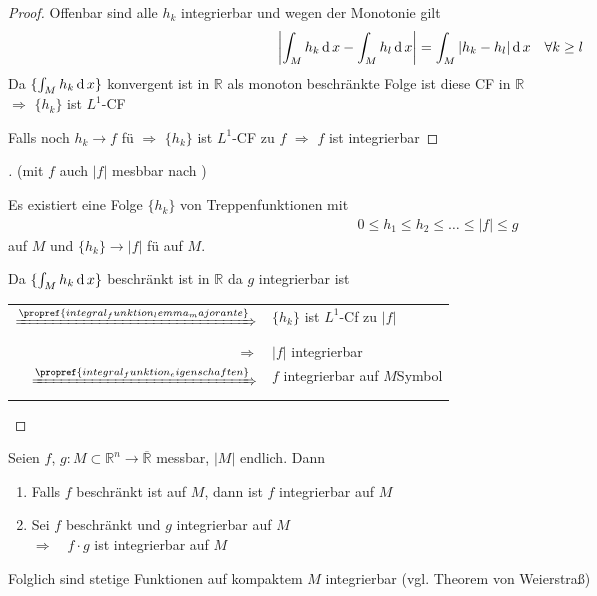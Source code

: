 \begin{proof}
	Offenbar sind alle $h_k$ integrierbar und wegen der Monotonie gilt \begin{align*}
		\left\vert \int_M h_k\operatorname{d} x - \int_M h_l\operatorname{d} x \right\vert &=\int_M \vert h_k - h_l\vert \operatorname{d} x\quad\forall k\ge l
	\end{align*}
	Da $\{ \int_M h_k \operatorname{d} x \}$ konvergent ist in $\mathbb{R}$ als monoton beschränkte Folge ist diese CF in $\mathbb{R}$ \\
	$\Rightarrow$ $\{ h_k\}$ ist $L^1$-CF
	
	Falls noch $h_k\to f$ \gls{fü} $\Rightarrow$ $\{h_k\}$ ist $L^1$-CF zu $f$ $\Rightarrow$ $f$ ist integrierbar
\end{proof}

\begin{proof}[]
	\NoEndMark
	(mit $f$ auch $\vert f \vert$ mesbbar nach )
	
	Es existiert eine Folge $\{ h_k \}$ von Treppenfunktionen mit \begin{align*}
		0 \le h_1 \le h_2 \le \dotsc \le \vert f \vert \le g
	\end{align*}
	auf $M$ und $\{ h_k\}\to\vert f \vert$ \gls{fü} auf $M$.
	
	Da $\{ \int_M h_k \operatorname{d} x \}$ beschränkt ist in $\mathbb{R}$ da $g$ integrierbar ist \\
	{\renewcommand{\arraystretch}{1.3}\begin{tabularx}{\linewidth}{r@{\ \ }X}
		$\xRightarrow{\propref{integral_funktion_lemma_majorante}}$ & $\{ h_k\}$ ist $L^1$-Cf zu $\vert f \vert$ \\
		$\Rightarrow$ & $\vert f \vert$ integrierbar \\
		$\xRightarrow{\propref{integral_funktion_eigenschaften}}$ & $f$ integrierbar auf $M$\hfill\csname\InTheoType Symbol\endcsname
	\end{tabularx}}
\end{proof}

\begin{conclusion}
	Seien $f$, $g:M\subset\mathbb{R}^n\to\overline{\mathbb{R}}$ messbar, $\vert M \vert$ endlich. Dann\begin{enumerate}[label={\alph*)}]
		\item Falls $f$ beschränkt ist auf $M$, dann ist $f$ integrierbar auf $M$
		\item Sei $f$ beschränkt und $g$ integrierbar auf $M$\\
		$\Rightarrow$\ \ $f\cdot g$ ist integrierbar auf $M$
	\end{enumerate}
\end{conclusion}
\begin{underlinedenvironment}[Hinweis]
	Folglich sind stetige Funktionen auf kompaktem $M$ integrierbar (vgl. Theorem von Weierstraß)
\end{underlinedenvironment}


